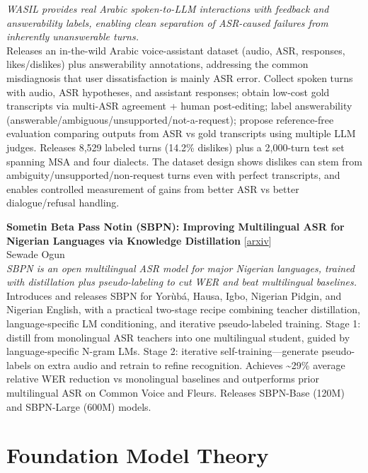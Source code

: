 \documentclass[12pt,letterpaper]{article}
\begin{document}
{\small\textit{WASIL provides real Arabic spoken-to-LLM interactions with feedback and answerability labels, enabling clean separation of ASR-caused failures from inherently unanswerable turns.}}\\[1pt]
{\footnotesize Releases an in-the-wild Arabic voice-assistant dataset (audio, ASR, responses, likes/dislikes) plus answerability annotations, addressing the common misdiagnosis that user dissatisfaction is mainly ASR error. Collect spoken turns with audio, ASR hypotheses, and assistant responses; obtain low-cost gold transcripts via multi-ASR agreement + human post-editing; label answerability (answerable/ambiguous/unsupported/not-a-request); propose reference-free evaluation comparing outputs from ASR vs gold transcripts using multiple LLM judges. Releases 8,529 labeled turns (14.2\% dislikes) plus a 2,000-turn test set spanning MSA and four dialects. The dataset design shows dislikes can stem from ambiguity/unsupported/non-request turns even with perfect transcripts, and enables controlled measurement of gains from better ASR vs better dialogue/refusal handling.}

\medskip

{\small\textbf{Sometin Beta Pass Notin (SBPN): Improving Multilingual ASR for Nigerian Languages via Knowledge Distillation}} {\scriptsize[\href{https://arxiv.org/abs/2605.17710}{arxiv}]}\\
{\scriptsize Sewade Ogun}\\

{\small\textit{SBPN is an open multilingual ASR model for major Nigerian languages, trained with distillation plus pseudo-labeling to cut WER and beat multilingual baselines.}}\\[1pt]
{\footnotesize Introduces and releases SBPN for Yorùbá, Hausa, Igbo, Nigerian Pidgin, and Nigerian English, with a practical two-stage recipe combining teacher distillation, language-specific LM conditioning, and iterative pseudo-labeled training. Stage 1: distill from monolingual ASR teachers into one multilingual student, guided by language-specific N-gram LMs. Stage 2: iterative self-training---generate pseudo-labels on extra audio and retrain to refine recognition. Achieves \textasciitilde{}29\% average relative WER reduction vs monolingual baselines and outperforms prior multilingual ASR on Common Voice and Fleurs. Releases SBPN-Base (120M) and SBPN-Large (600M) models.}

\medskip


\section*{Foundation Model Theory}
\end{document}
